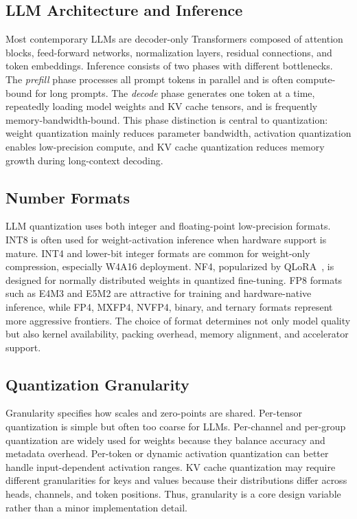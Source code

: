 \documentclass[journal,10pt]{IEEEtran}
\begin{document}
\subsection{LLM Architecture and Inference}
Most contemporary LLMs are decoder-only Transformers composed of attention blocks, feed-forward networks, normalization layers, residual connections, and token embeddings. Inference consists of two phases with different bottlenecks. The \emph{prefill} phase processes all prompt tokens in parallel and is often compute-bound for long prompts. The \emph{decode} phase generates one token at a time, repeatedly loading model weights and KV cache tensors, and is frequently memory-bandwidth-bound. This phase distinction is central to quantization: weight quantization mainly reduces parameter bandwidth, activation quantization enables low-precision compute, and KV cache quantization reduces memory growth during long-context decoding.

\subsection{Number Formats}
LLM quantization uses both integer and floating-point low-precision formats. INT8 is often used for weight-activation inference when hardware support is mature. INT4 and lower-bit integer formats are common for weight-only compression, especially W4A16 deployment. NF4, popularized by QLoRA~\cite{dettmers2023qlora}, is designed for normally distributed weights in quantized fine-tuning. FP8 formats such as E4M3 and E5M2 are attractive for training and hardware-native inference, while FP4, MXFP4, NVFP4, binary, and ternary formats represent more aggressive frontiers. The choice of format determines not only model quality but also kernel availability, packing overhead, memory alignment, and accelerator support.

\subsection{Quantization Granularity}
Granularity specifies how scales and zero-points are shared. Per-tensor quantization is simple but often too coarse for LLMs. Per-channel and per-group quantization are widely used for weights because they balance accuracy and metadata overhead. Per-token or dynamic activation quantization can better handle input-dependent activation ranges. KV cache quantization may require different granularities for keys and values because their distributions differ across heads, channels, and token positions. Thus, granularity is a core design variable rather than a minor implementation detail.
\end{document}
